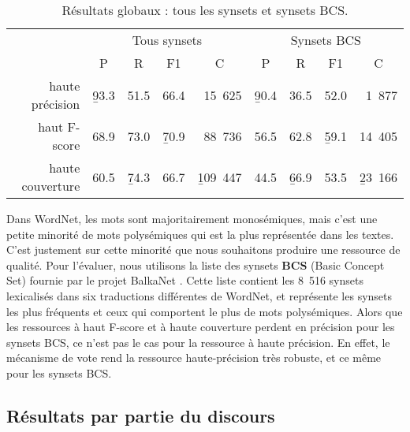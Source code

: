 \begin{table}[ht]
\centering
\begin{tabular}{rcccc|cccc}
  \toprule
                   & \multicolumn{4}{c}{Tous synsets} & \multicolumn{4}{c}{Synsets BCS}     \\
                   &   P      &    R     &   F1     &   C         &   P      &   R      &   F1     &   C    \\
  haute précision  & \b{93.3} & 51.5     & 66.4     & ~15~625     & \b{90.4} & 36.5     & 52.0     & ~1~877 \\
  haut F-score     & 68.9     & 73.0     & \b{70.9} & ~88~736     & 56.5     & 62.8     & \b{59.1} & 14~405 \\
  haute couverture & 60.5     & \b{74.3} & 66.7     & \b{109~447} & 44.5     & \b{66.9} & 53.5     & \b{23~166} \\
  \bottomrule
\end{tabular}
\caption{\label{table:allvsbcs}Résultats globaux : tous les synsets et synsets BCS.}
\end{table}


Dans WordNet, les mots sont majoritairement monosémiques, mais c'est une petite
minorité de mots polysémiques qui est la plus représentée dans les textes.
C'est justement sur cette minorité que nous souhaitons produire une ressource
de qualité. Pour l'évaluer, nous utilisons la liste des synsets \textbf{BCS}
(Basic Concept Set) fournie par le projet BalkaNet \citep{tufis2004balkanet}.
Cette liste contient les 8~516 synsets lexicalisés dans six traductions
différentes de WordNet, et représente les synsets les plus fréquents et ceux
qui comportent le plus de mots polysémiques. Alors que les ressources à haut
F-score et à haute couverture perdent en précision pour les synsets BCS, ce
n'est pas le cas pour la ressource à haute précision.  En effet, le mécanisme
de vote rend la ressource haute-précision très robuste, et ce même pour les
synsets BCS.


\subsection{Résultats par partie du discours}
\label{subsec:pos_results}


